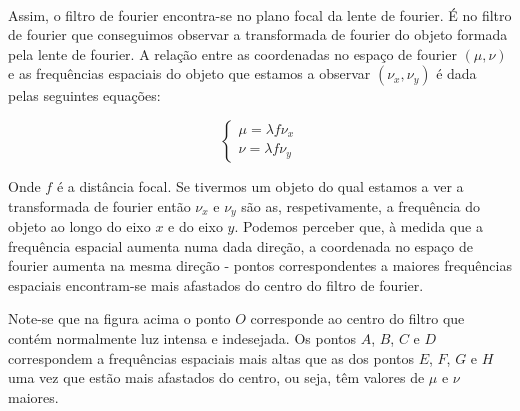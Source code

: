 \documentclass{article}
\begin{document}
\begin{multicols}{2}
\paragraph{}
Assim, o filtro de fourier encontra-se no plano focal da lente de fourier. É no filtro de fourier que conseguimos observar a transformada de fourier do objeto formada pela lente de fourier.
A relação entre as coordenadas no espaço de fourier $(\mu, \nu)$ e as frequências espaciais do objeto que estamos a observar $(\nu_x, \nu_y)$ é dada pelas seguintes equações:

\[ \begin{cases}
  \mu = \lambda f \nu_x \\
  \nu = \lambda f \nu_y
\end{cases} \]

Onde $f$ é a distância focal. 
Se tivermos um objeto do qual estamos a ver a transformada de fourier então $\nu_x$ e $\nu_y$ são as, respetivamente, a frequência do objeto ao longo do eixo $x$ e do eixo $y$.
Podemos perceber que, à medida que a frequência espacial aumenta numa dada direção, a coordenada no espaço de fourier aumenta na mesma direção - pontos correspondentes a maiores frequências espaciais encontram-se mais afastados do centro do filtro de fourier.

\begin{center}
  
    
\end{center}

Note-se que na figura acima o ponto $O$ corresponde ao centro do filtro que contém normalmente luz intensa e indesejada.
Os pontos $A$, $B$, $C$ e $D$ correspondem a frequências espaciais mais altas que as dos pontos $E$, $F$, $G$ e $H$ uma vez que estão mais afastados do centro, ou seja, têm valores de $\mu$ e $\nu$ maiores. 


\end{multicols}
\end{document}
